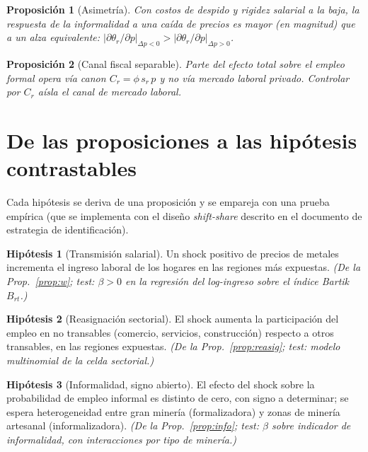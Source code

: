 \documentclass[11pt]{article}
\theoremstyle{definition}
\newtheorem{hipotesis}{Hipótesis}
\theoremstyle{plain}
\newtheorem{prop}{Proposición}
\begin{document}
\begin{prop}[Asimetría]\label{prop:asim}
Con costos de despido y rigidez salarial a la baja, la respuesta de la informalidad a una caída
de precios es mayor (en magnitud) que a un alza equivalente:
$\big|\partial \theta_r/\partial p\big|_{\Delta p<0} > \big|\partial \theta_r/\partial
p\big|_{\Delta p>0}$.
\end{prop}

\begin{prop}[Canal fiscal separable]\label{prop:canon}
Parte del efecto total sobre el empleo formal opera vía canon $C_r=\phi\,s_r\,p$ y no vía
mercado laboral privado. Controlar por $C_r$ aísla el canal de mercado laboral.
\end{prop}

\section{De las proposiciones a las hipótesis contrastables}

Cada hipótesis se deriva de una proposición y se empareja con una prueba empírica (que se
implementa con el diseño \textit{shift-share} descrito en el documento de estrategia de
identificación).

\begin{hipotesis}[Transmisión salarial]\label{h:w}
Un shock positivo de precios de metales incrementa el ingreso laboral de los hogares en las
regiones más expuestas. \emph{(De la Prop.~\ref{prop:w}; test: $\beta>0$ en la regresión del
log-ingreso sobre el índice Bartik $B_{rt}$.)}
\end{hipotesis}

\begin{hipotesis}[Reasignación sectorial]\label{h:reasig}
El shock aumenta la participación del empleo en no transables (comercio, servicios,
construcción) respecto a otros transables, en las regiones expuestas. \emph{(De la
Prop.~\ref{prop:reasig}; test: modelo multinomial de la celda sectorial.)}
\end{hipotesis}

\begin{hipotesis}[Informalidad, signo abierto]\label{h:info}
El efecto del shock sobre la probabilidad de empleo informal es distinto de cero, con signo a
determinar; se espera heterogeneidad entre gran minería (formalizadora) y zonas de minería
artesanal (informalizadora). \emph{(De la Prop.~\ref{prop:info}; test: $\beta$ sobre indicador
de informalidad, con interacciones por tipo de minería.)}
\end{hipotesis}
\end{document}

